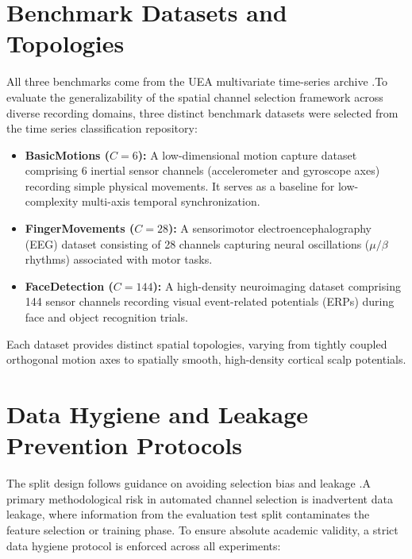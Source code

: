\section{Benchmark Datasets and Topologies}
\label{sec:datasets}

\noindent
All three benchmarks come from the UEA multivariate time-series archive
\citep{bagnall2018uea}.To evaluate the generalizability of the spatial channel selection framework across diverse recording domains, three distinct benchmark datasets were selected from the time series classification repository:

\begin{itemize}
    \item \textbf{BasicMotions ($C = 6$):} A low-dimensional motion capture dataset comprising 6 inertial sensor channels (accelerometer and gyroscope axes) recording simple physical movements. It serves as a baseline for low-complexity multi-axis temporal synchronization.
    \item \textbf{FingerMovements ($C = 28$):} A sensorimotor electroencephalography (EEG) dataset consisting of 28 channels capturing neural oscillations ($\mu/\beta$ rhythms) associated with motor tasks.
    \item \textbf{FaceDetection ($C = 144$):} A high-density neuroimaging dataset comprising 144 sensor channels recording visual event-related potentials (ERPs) during face and object recognition trials.
\end{itemize}

\noindent
Each dataset provides distinct spatial topologies, varying from tightly coupled orthogonal motion axes to spatially smooth, high-density cortical scalp potentials.

\section{Data Hygiene and Leakage Prevention Protocols}
\label{sec:data_hygiene}

\noindent
The split design follows guidance on avoiding selection bias and leakage
\citep{varma2006bias,cawley2010overfitting,kaufman2012leakage,
krstajic2014crossvalidation}.A primary methodological risk in automated channel selection is inadvertent data leakage, where information from the evaluation test split contaminates the feature selection or training phase. To ensure absolute academic validity, a strict data hygiene protocol is enforced across all experiments:

